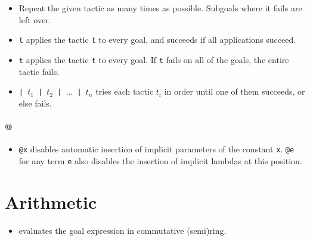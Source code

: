 \documentclass[a4paper]{article}
\begin{document}
\begin{itemize}
    \item Repeat the given tactic as many times as possible. Subgoals where it fails are left over.
\end{itemize}


\begin{itemize}
    \item \allgoals \texttt{t} applies the tactic \texttt{t} to every goal, and succeeds if all applications succeed.
\end{itemize}


\begin{itemize}
    \item \anygoals \texttt{t} applies the tactic \texttt{t} to every goal. If \texttt{t} fails on all of the goals, the entire tactic fails.
\end{itemize}


\begin{itemize}
    \item \texttt{\first | $t_1$ | $t_2$ | $\dots$ | $t_n$} tries each tactic $t_i$ in order until one of them succeeds, or else fails.
\end{itemize}

\paragraph{@}

\begin{itemize}
    \item \texttt{@x} disables automatic insertion of implicit parameters of the constant \texttt{x}. \texttt{@e} for any term \texttt{e} also disables the insertion of implicit lambdas at this position.
\end{itemize}

\section{Arithmetic}


\begin{itemize}
    \item \ring evaluates the goal expression in commutative (semi)ring.
\end{itemize}
\end{document}
